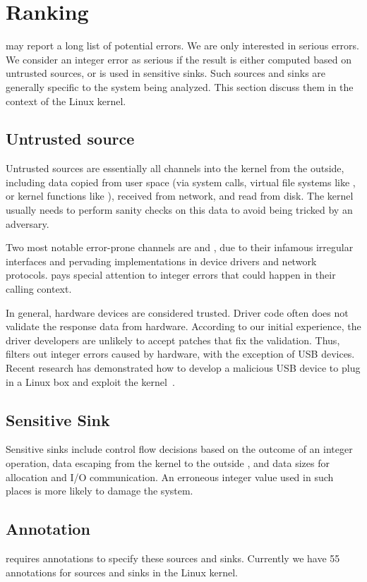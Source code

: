 \section{Ranking}
\label{s:rank}

\sys may report a long list of potential errors.  We are only interested
in serious errors.  We consider an integer error as serious if the
result is either computed based on untrusted sources, or is used in
sensitive sinks.  Such sources and sinks are generally specific to
the system being analyzed.  This section discuss them in the context
of the Linux kernel.

\subsection{Untrusted source}

Untrusted sources are essentially all channels into the kernel from
the outside, including data copied from user space (via system
calls, virtual file systems like , or kernel functions
like ), received from network, and read from
disk.
The kernel usually needs to perform sanity checks on this data to
avoid being tricked by an adversary.

Two most notable error-prone channels are  and ,
due to their infamous irregular interfaces and pervading implementations
in device drivers and network protocols.  \sys pays special attention
to integer errors that could happen in their calling context.

In general, hardware devices are considered trusted.  Driver code
often does not validate the response data from hardware.  According
to our initial experience, the driver developers are unlikely to
accept patches that fix the validation.  Thus, \sys filters out
integer errors caused by hardware,
%
with the exception of USB devices.  Recent research has demonstrated
how to develop a malicious USB device to plug in a Linux box and
exploit the kernel~\cite{usb:buffer-overflow}.

\subsection{Sensitive Sink}

Sensitive sinks include control flow decisions based on the outcome
of an integer operation, data escaping from the kernel to the
outside , and data
sizes for allocation and I/O communication.  An erroneous integer
value used in such places is more likely to damage the system.

\subsection{Annotation}

\sys requires annotations to specify these sources and sinks.
Currently we have 55 annotations for sources and sinks in the Linux kernel.
